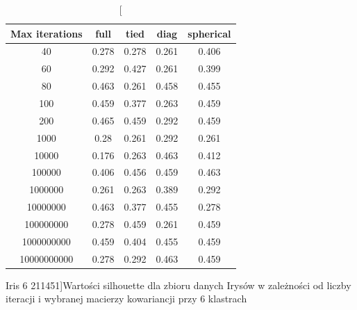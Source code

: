 \documentclass{classrep}
\begin{document}
{{\begin{table}[!htbp]
                \begin{minipage}{1\textwidth}
                \centering
                \begin{tabular}{|c|c|c|c|c|}
                \hline
                Max iterations & full & tied & diag & spherical \\ \hline
                40 & 0.278 & 0.278 & 0.261 & 0.406 \\ \hline
                60 & 0.292 & 0.427 & 0.261 & 0.399 \\ \hline
                80 & 0.463 & 0.261 & 0.458 & 0.455 \\ \hline
                100 & 0.459 & 0.377 & 0.263 & 0.459 \\ \hline
                200 & 0.465 & 0.459 & 0.292 & 0.459 \\ \hline
                1000 & 0.28 & 0.261 & 0.292 & 0.261 \\ \hline
                10000 & 0.176 & 0.263 & 0.463 & 0.412 \\ \hline
                100000 & 0.406 & 0.456 & 0.459 & 0.463 \\ \hline
                1000000 & 0.261 & 0.263 & 0.389 & 0.292 \\ \hline
                10000000 & 0.463 & 0.377 & 0.455 & 0.278 \\ \hline
                100000000 & 0.278 & 0.459 & 0.261 & 0.459 \\ \hline
                1000000000 & 0.459 & 0.404 & 0.455 & 0.459 \\ \hline
                10000000000 & 0.278 & 0.292 & 0.463 & 0.459 \\ \hline
                \end{tabular}
                \caption
                [Iris 6 211451]{Wartości silhouette dla zbioru danych Irysów w zależności od liczby iteracji i wybranej macierzy kowariancji przy 6 klastrach}
                \label{Iris_6_211451}
                \end{minipage}
                \hfill
                

\end{table}}}
\end{document}
